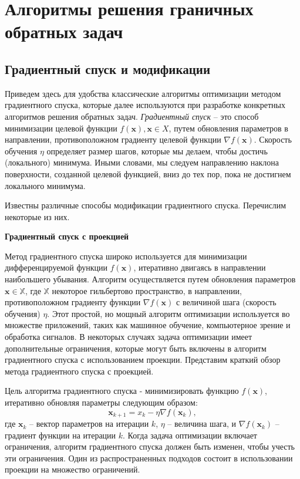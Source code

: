 \section{Алгоритмы решения граничных обратных задач}\label{sec:ch4/sec3}


\subsection{Градиентный спуск и модификации}
\label{subsec:ch4/sec3/grad}


Приведем здесь для удобства классические алгоритмы оптимизации методом градиентного спуска,
которые далее используются при разработке конкретных алгоритмов решения обратных задач.
\textit{Градиентный спуск} -- это способ минимизации целевой функции
$f(\mathbf{x}), \mathbf{x} \in X$, путем обновления параметров
в направлении, противоположном градиенту целевой функции
$\nabla f(\mathbf{x})$.
Скорость обучения $\eta$ определяет размер шагов, которые мы делаем,
чтобы достичь (локального) минимума.
Иными словами, мы следуем направлению наклона поверхности,
созданной целевой функцией, вниз до тех пор,
пока не достигнем локального минимума.

Известны различные способы модификации градиентного спуска.
Перечислим некоторые из них.

\textbf{Градиентный спуск с проекцией}

Метод градиентного спуска широко используется для минимизации дифференцируемой
функции $f(\mathbf{x})$, итеративно двигаясь в направлении наибольшего убывания.
Алгоритм осуществляется путем обновления параметров
$\mathbf{x} \in \mathbb{X}$, где $\mathbb{X}$ некоторое гильбертово пространство,
в направлении, противоположном
градиенту функции $\nabla f(\mathbf{x})$ с величиной шага
(скорость обучения) $\eta$.
Этот простой, но мощный алгоритм оптимизации используется во
множестве приложений, таких как машинное обучение, компьютерное
зрение и обработка сигналов.
В некоторых случаях задача оптимизации
имеет дополнительные ограничения, которые могут быть включены в
алгоритм градиентного спуска с использованием проекции.
Представим краткий обзор метода градиентного спуска с проекцией.


Цель алгоритма градиентного спуска - минимизировать функцию
$f(\mathbf{x})$, итеративно обновляя параметры следующим образом:
\[ \mathbf{x}_{k+1} = x_k - \eta \nabla f(\mathbf{x}_k), \]
где $\mathbf{x}_k$ -- вектор параметров на итерации $k$,
$\eta$ -- величина шага, и $\nabla f(\mathbf{x}_k)$ -- градиент
функции на итерации $k$.
Когда задача оптимизации включает ограничения, алгоритм
градиентного спуска должен быть изменен, чтобы учесть эти ограничения.
Один из распространенных подходов состоит в использовании проекции
на множество ограничений.


